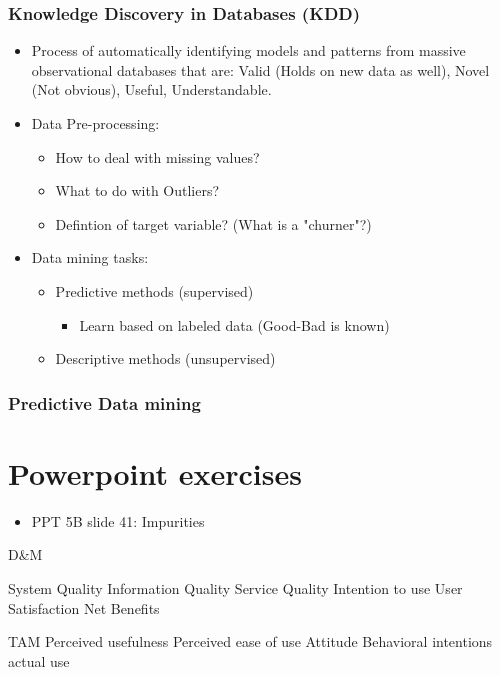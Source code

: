 \documentclass[]{report}
\begin{document}
    \subsection{Knowledge Discovery in Databases (KDD)}
      \begin{itemize}
        \item Process of automatically identifying models and patterns from massive observational databases that are: Valid (Holds on new data as well), Novel (Not obvious), Useful, Understandable.
        \item Data Pre-processing:
        \begin{itemize}
          \item How to deal with missing values?
          \item What to do with Outliers?
          \item Defintion of target variable? (What is a "churner"?)
        \end{itemize}
        \item Data mining tasks:
        \begin{itemize}
          \item Predictive methods (supervised)
          \begin{itemize}
            \item Learn based on labeled data (Good-Bad is known)
          \end{itemize}
          \item Descriptive methods (unsupervised)
        \end{itemize}
      \end{itemize}
    \subsection{Predictive Data mining}



\chapter{Powerpoint exercises}
  \begin{itemize}
    \item PPT 5B slide 41: Impurities
  \end{itemize}



D&M

  System Quality
  Information Quality
  Service Quality
  Intention to use
  User Satisfaction
  Net Benefits


TAM
  Perceived usefulness
  Perceived ease of use
  Attitude
  Behavioral intentions
  actual use
\end{document}
